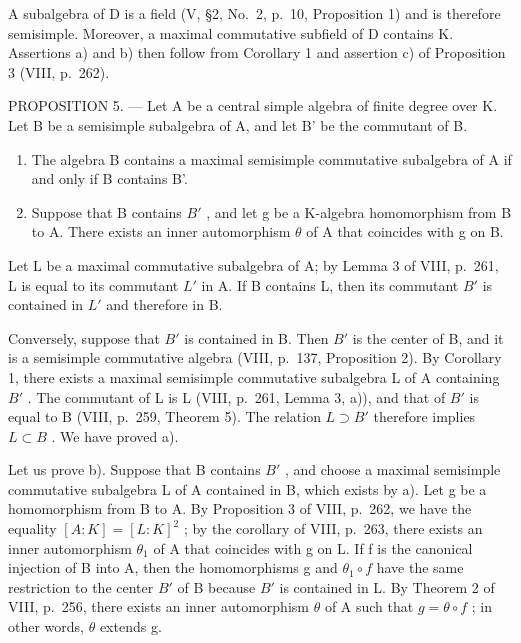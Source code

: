 A subalgebra of D is a field (V, §2, No.~2, p.~10, Proposition 1) and is therefore semisimple. Moreover, a maximal commutative subfield of D contains K. Assertions a) and b) then follow from Corollary 1 and assertion c) of Proposition 3 (VIII, p.~262).

PROPOSITION 5. --- Let A be a central simple algebra of finite degree over K. Let B be a semisimple subalgebra of A, and let B' be the commutant of B.

\begin{enumerate}
\def\labelenumi{\alph{enumi})}
\item
  The algebra B contains a maximal semisimple commutative subalgebra of A if and only if B contains B'.
\item
  Suppose that B contains \(B'\) , and let g be a K-algebra homomorphism from B to A. There exists an inner automorphism \(\theta\) of A that coincides with g on B.
\end{enumerate}

Let L be a maximal commutative subalgebra of A; by Lemma 3 of VIII, p.~261, L is equal to its commutant \(L'\) in A. If B contains L, then its commutant \(B'\) is contained in \(L'\) and therefore in B.

Conversely, suppose that \(B'\) is contained in B. Then \(B'\) is the center of B, and it is a semisimple commutative algebra (VIII, p.~137, Proposition 2). By Corollary 1, there exists a maximal semisimple commutative subalgebra L of A containing \(B'\) . The commutant of L is L (VIII, p.~261, Lemma 3, a)), and that of \(B'\) is equal to B (VIII, p.~259, Theorem 5). The relation \(L \supset B'\) therefore implies \(L \subset B\) . We have proved a).

Let us prove b). Suppose that B contains \(B'\) , and choose a maximal semisimple commutative subalgebra L of A contained in B, which exists by a). Let g be a homomorphism from B to A. By Proposition 3 of VIII, p.~262, we have the equality \([A:K]=[L:K]^{2}\) ; by the corollary of VIII, p.~263, there exists an inner automorphism \(\theta_{1}\) of A that coincides with g on L. If f is the canonical injection of B into A, then the homomorphisms g and \(\theta_{1}\circ f\) have the same restriction to the center \(B'\) of B because \(B'\) is contained in L. By Theorem 2 of VIII, p.~256, there exists an inner automorphism \(\theta\) of A such that \(g=\theta\circ f\) ; in other words, \(\theta\) extends g.

